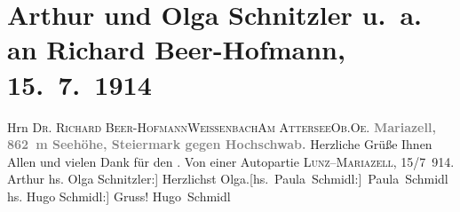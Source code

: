 

         
         \renewcommand{\erwaehntePersonen}{Personen: Richard Beer-Hofmann}
         \renewcommand{\erwaehnteOrte}{Orte: Attersee, Hochschwab, Lunz am See, Mariazell, Oberösterreich, Steiermark, Weißenbach am Attersee, Wien}
         \renewcommand{\erwaehnteWerke}{}
               \section[Arthur und Olga Schnitzler u. a. an Richard Beer-Hofmann, 15. 7. 1914]{ Arthur und Olga Schnitzler u. a. an Richard Beer-Hofmann,
               15. 7. 1914}\nopagebreak{}\rehead{ }\begin{ledgroupsized}[t]{13cm}\normalsize\beginnumbering \toendnotes[C]{\smallbreak\pagebreak[2]} 
\toendnotes[C]{\smallbreak}\pstart{}{\pb}Hrn \textsc{Dr. Richard Beer-Hofmann}\pend{}\pstart{}\textsc{Weissenbach}\pend{}\pstart{}\textsc{Am Attersee}\pend{}\pstart{}\textsc{Ob.Oe.}\pend{}{\bigskip}\pstart
           \noindent{}\centering{}{\pb}\textcolor{gray}{\textbf{Mariazell, 862 m Seehöhe, Steiermark gegen Hochschwab.}}\pend
           \pstart
           {\pb}Herzliche Grüße Ihnen Allen und vielen Dank für den
                  \label{K_L02186-1v}\label{K_L02186-1h}.\pend
           \pstart
           Von einer Autopartie \textsc{Lunz}–\textsc{Mariazell}, 15/7 914.\pend
           \pstart \spacefill\mbox{Arthur}\pend{}\pstart
           \noindent{}{[}hs. Olga Schnitzler:{]} Herzlichst\pend
           \pstart \spacefill\mbox{Olga.}\pend{}\pstart \spacefill\mbox{{[}hs. Paula Schmidl:{]} Paula Schmidl}\pend{}\pstart
           \noindent{}{[}hs. Hugo Schmidl:{]} Gruss!\pend
           \pstart \spacefill\mbox{Hugo Schmidl}\pend{}
         
         \endnumbering{}\end{ledgroupsized}  \newcommand{\dateiname}{L02186}\newcommand{\titel}{Arthur und Olga Schnitzler u. a. an Richard Beer-Hofmann, 15. 7. 1914}\newcommand{\editorInnen}{Martin Anton Müller und Gerd-Hermann Susen}
      
